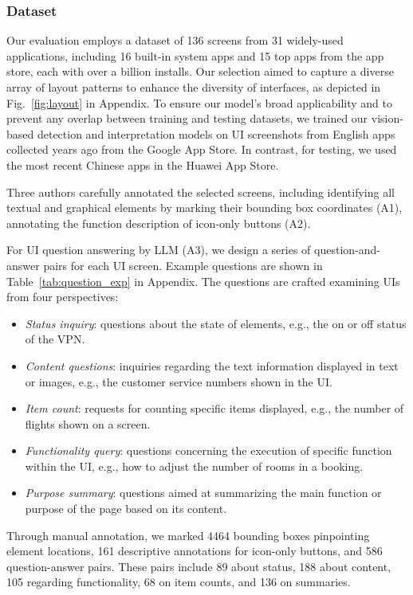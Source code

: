 \subsubsection{Dataset}
Our evaluation employs a dataset of 136 screens from 31 widely-used applications, including 16 built-in system apps and 15 top apps from the app store, each with over a billion installs. Our selection aimed to capture a diverse array of layout patterns to enhance the diversity of interfaces, as depicted in Fig.~\ref{fig:layout} in Appendix. To ensure our model's broad applicability and to prevent any overlap between training and testing datasets, we trained our vision-based detection and interpretation models on UI screenshots from English apps collected years ago from the Google App Store. In contrast, for testing, we used the most recent Chinese apps in the Huawei App Store. 

Three authors carefully annotated the selected screens, including identifying all textual and graphical elements by marking their bounding box coordinates (A1), annotating the function description of icon-only buttons (A2).

For UI question answering by LLM (A3), we design a series of question-and-answer pairs for each UI screen. Example questions are shown in Table~\ref{tab:question_exp} in Appendix. The questions are crafted examining UIs from four perspectives: 
\begin{itemize}
    \item \textit{Status inquiry}: questions about the state of elements, e.g., the on or off status of the VPN.
    \item \textit{Content questions}: inquiries regarding the text information displayed in text or images, e.g., the customer service numbers shown in the UI.
    \item \textit{Item count}: requests for counting specific items displayed, e.g., the number of flights shown on a screen.
    \item \textit{Functionality query}: questions concerning the execution of specific function within the UI, e.g., how to adjust the number of rooms in a booking.
    \item \textit{Purpose summary}: questions aimed at summarizing the main function or purpose of the page based on its content.
\end{itemize}

Through manual annotation, we marked 4464 bounding boxes pinpointing element locations, 161 descriptive annotations for icon-only buttons, and 586 question-answer pairs. These pairs include 89 about status, 188 about content, 105 regarding functionality, 68 on item counts, and 136 on summaries.


